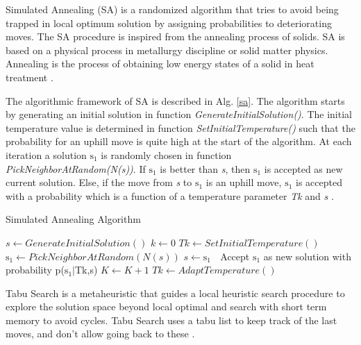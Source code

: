 \documentclass[review]{elsarticle}
\begin{document}
Simulated Annealing (SA) is a randomized algorithm that tries to avoid being trapped in local optimum solution by assigning probabilities to deteriorating moves. The SA procedure is inspired from the annealing process of solids. SA is based on a physical
process in metallurgy discipline or solid matter physics. Annealing is the process of obtaining low energy states of a solid in heat treatment \cite{Jaziri2008}. 

The algorithmic framework of SA is described in Alg. \ref{sa}.  The algorithm starts by generating an initial solution in function \textit{GenerateInitialSolution()}. The initial temperature value is determined in function \textit{SetInitialTemperature()} such that the probability for an uphill move is quite high at the start of the algorithm. At each iteration a solution $\mbox{s}_1$ is randomly chosen in function \textit{PickNeighborAtRandom(N(s))}. If \textit{$\mbox{s}_1$} is better than \textit{s}, then \textit{$\mbox{s}_1$} is accepted as new current solution. Else, if the move from \textit{s} to \textit{$\mbox{s}_1$} is an uphill move, \textit{$\mbox{s}_1$}  is accepted with a probability which is a function of a temperature parameter \textit{Tk} and \textit{s} \cite{raidl2010metaheuristic}. 

\begin{algorithm}[H]
  \caption{Simulated Annealing Algorithm}\label{sa}
  \begin{algorithmic}[1]
    
    \State $s\gets GenerateInitialSolution()$
    \State $k\gets 0 $
    \State $Tk\gets SetInitialTemperature()$
    \State $\mbox{s}_1\gets PickNeighborAtRandom(N (s))$
    \State $s\gets\mbox{s}_1$
    \Else $\;$ Accept $\mbox{s}_1$ as new solution with probability p($\mbox{s}_1|$Tk,s) 
    \EndIf
    \State $K\gets K+1$
    \State $Tk\gets AdaptTemperature()$
    \EndWhile
      
  \end{algorithmic}
\end{algorithm}


Tabu Search is a metaheuristic that guides a local heuristic search procedure to explore the solution space beyond local optimal and search with short term memory to avoid cycles. Tabu Search uses a  tabu list to keep track of the last  moves, and don’t allow going back to these \cite{Glover1986}.
\end{document}
